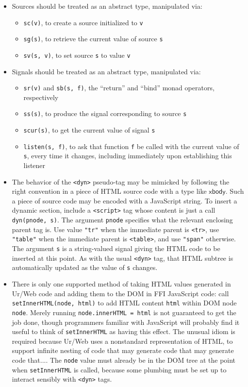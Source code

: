 \documentclass{article}
\newcommand{\cd}[1]{\texttt{#1}}
\newcommand{\mt}[1]{\mathsf{#1}}
\begin{document}
\begin{itemize}
\item Sources should be treated as an abstract type, manipulated via:
  \begin{itemize}
  \item \cd{sc(v)}, to create a source initialized to \cd{v}
  \item \cd{sg(s)}, to retrieve the current value of source \cd{s}
  \item \cd{sv(s, v)}, to set source \cd{s} to value \cd{v}
  \end{itemize}

\item Signals should be treated as an abstract type, manipulated via:
  \begin{itemize}
  \item \cd{sr(v)} and \cd{sb(s, f)}, the ``return'' and ``bind'' monad operators, respectively
  \item \cd{ss(s)}, to produce the signal corresponding to source \cd{s}
  \item \cd{scur(s)}, to get the current value of signal \cd{s}
  \item \cd{listen(s, f)}, to ask that function \cd{f} be called with the current value of \cd{s}, every time it changes, including immediately upon establishing this listener
  \end{itemize}

\item The behavior of the \cd{<dyn>} pseudo-tag may be mimicked by following the right convention in a piece of HTML source code with a type like $\mt{xbody}$.  Such a piece of source code may be encoded with a JavaScript string.  To insert a dynamic section, include a \cd{<script>} tag whose content is just a call \cd{dyn(pnode, s)}.  The argument \cd{pnode} specifies what the relevant enclosing parent tag is.  Use value \cd{"tr"} when the immediate parent is \cd{<tr>}, use \cd{"table"} when the immediate parent is \cd{<table>}, and use \cd{"span"} otherwise.  The argument \cd{s} is a string-valued signal giving the HTML code to be inserted at this point.  As with the usual \cd{<dyn>} tag, that HTML subtree is automatically updated as the value of \cd{s} changes.

\item There is only one supported method of taking HTML values generated in Ur/Web code and adding them to the DOM in FFI JavaScript code: call \cd{setInnerHTML(node, html)} to add HTML content \cd{html} within DOM node \cd{node}.  Merely running \cd{node.innerHTML = html} is not guaranteed to get the job done, though programmers familiar with JavaScript will probably find it useful to think of \cd{setInnerHTML} as having this effect.  The unusual idiom is required because Ur/Web uses a nonstandard representation of HTML, to support infinite nesting of code that may generate code that may generate code that....  The \cd{node} value must already be in the DOM tree at the point when \cd{setInnerHTML} is called, because some plumbing must be set up to interact sensibly with \cd{<dyn>} tags. 


\end{itemize}
\end{document}
